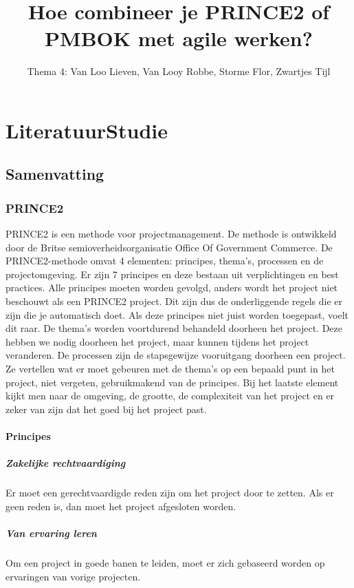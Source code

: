 \documentclass[]{article}
\title{Hoe combineer je PRINCE2 of PMBOK met agile werken?}
\author{Thema 4: Van Loo Lieven, Van Looy Robbe, Storme Flor, Zwartjes Tijl}
\begin{document}
\maketitle
\begin{abstract}

\end{abstract}

\tableofcontents


\section{LiteratuurStudie}
\subsection{Samenvatting}

\subsubsection{PRINCE2}
PRINCE2 is een methode voor projectmanagement. De methode is ontwikkeld door de Britse semioverheidsorganisatie Office Of Government Commerce. De PRINCE2-methode omvat 4 elementen: principes, thema’s, processen en de projectomgeving. Er zijn 7 principes en deze bestaan uit verplichtingen en best practices. Alle principes moeten worden gevolgd, anders wordt het project niet beschouwt als een PRINCE2 project.  Dit zijn dus de onderliggende regels die er zijn die je automatisch doet. Als deze principes niet juist worden toegepast, voelt dit raar. De thema’s worden voortdurend behandeld doorheen het project. Deze hebben we nodig doorheen het project, maar kunnen tijdens het project veranderen. De processen zijn de stapsgewijze vooruitgang doorheen een project. Ze vertellen wat er moet gebeuren met de thema’s op een bepaald punt in het project, niet vergeten, gebruikmakend van de principes. Bij het laatste element kijkt men naar de omgeving, de grootte, de complexiteit van het project en er zeker van zijn dat het goed bij het project past.

\paragraph{Principes}

\subparagraph{Zakelijke rechtvaardiging}
Er moet een gerechtvaardigde reden zijn om het project door te zetten. Als er geen reden is, dan moet het project afgesloten worden.

\subparagraph{Van ervaring leren}
Om een project in goede banen te leiden, moet er zich gebaseerd worden op ervaringen van vorige projecten. 
\end{document}
